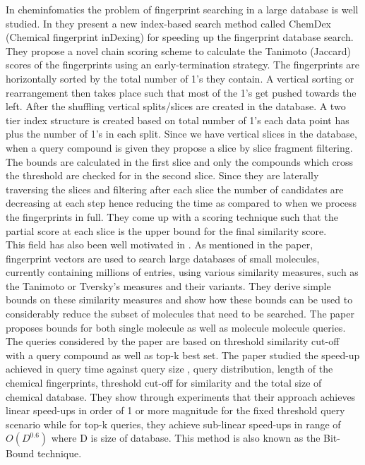 
In cheminfomatics the problem of fingerprint searching in a large database is well studied. In \citet*{aung2010indexing} they present a new index-based search method called ChemDex (Chemical fingerprint inDexing) for speeding up the fingerprint database search. They propose a novel chain scoring scheme to calculate the Tanimoto (Jaccard) scores of the fingerprints using an early-termination strategy. The fingerprints are horizontally sorted by the total number of 1's they contain. A vertical sorting or rearrangement then takes place such that most of the 1's get pushed towards the left. After the shuffling vertical splits/slices are created in the database. A two tier index structure is created based on total number of 1's each data point has plus the number of 1's in each split. Since we have vertical slices in the database, when a query compound is given they propose a slice by slice fragment filtering. The bounds are calculated in the first slice and only the compounds which cross the threshold are checked for in the second slice. Since they are laterally traversing the slices and filtering after each slice the number of candidates are decreasing at each step hence reducing the time as compared to when we process the fingerprints in full. They come up with a scoring technique such that the partial score at each slice is the upper bound for the final similarity score.\\

This field has also been well motivated in \citet*{swamidass2007bounds}. As mentioned in the paper, fingerprint vectors are used to search large databases of small molecules, currently containing millions of entries, using various similarity measures, such as the Tanimoto or Tversky's measures and their variants. They derive simple bounds on these similarity measures and show how these bounds can be used to considerably reduce the subset of molecules that need to be searched. The paper proposes bounds for both single molecule as well as molecule molecule queries. The queries considered by the paper are based on threshold similarity cut-off with a query compound as well as top-k best set. The paper studied the speed-up achieved in query time against query size , query distribution, length of the chemical fingerprints, threshold cut-off for similarity and the total size of chemical database. They show through experiments that their approach achieves linear speed-ups in order of 1 or more magnitude for the fixed threshold query scenario while for top-k queries, they achieve sub-linear speed-ups in range of $O(D^{0.6})$ where D is size of database. This method is also known as the Bit-Bound technique.\\


